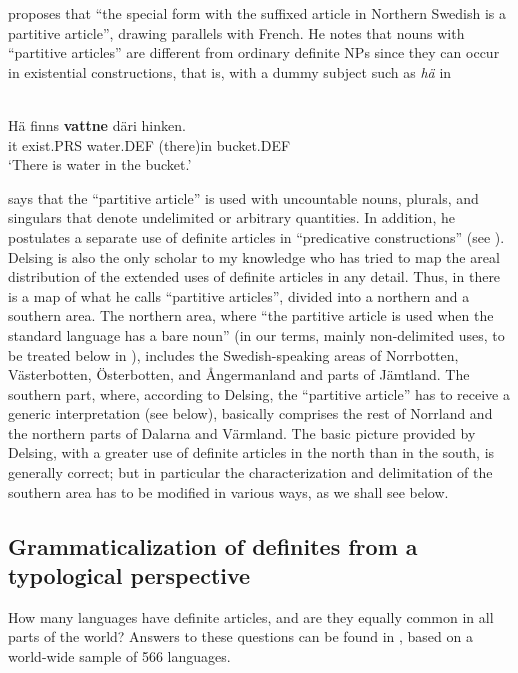 \citet[50]{Delsing1993} proposes that “the special form with the suffixed article in Northern Swedish is a partitive article”, drawing parallels with French. He notes that nouns with “partitive articles” are different from ordinary definite NPs since they can occur in existential constructions, that is, with a dummy subject such as \textit{hä} in 

\ea\label{}
\\
	\gll	Hä  finns  \textbf{vattne} däri  hinken.\\
			it  exist.PRS  water.DEF  (there)in  bucket.DEF\\
			
	\glt ‘There is water in the bucket.’
\z

\citet[15]{Delsing2003a} says that the “partitive article” is used with uncountable nouns, plurals, and singulars that denote undelimited or arbitrary quantities. In addition, he postulates a separate use of definite articles in “predicative constructions” (see ). Delsing is also the only scholar to my knowledge who has tried to map the areal distribution of the extended uses of definite articles in any detail. Thus, in \citet[18]{Delsing2003a} there is a map of what he calls “partitive articles”, divided into a northern and a southern area. The northern area, where “the partitive article is used when the standard language has a bare noun” (in our terms, mainly non-delimited uses, to be treated below in ), includes the Swedish-speaking areas of Norrbotten, Västerbotten, Österbotten, and Ångermanland and parts of Jämtland. The southern part, where, according to Delsing, the “partitive article” has to receive a generic interpretation (see  below), basically comprises the rest of Norrland and the northern parts of Dalarna and Värmland. The basic picture provided by Delsing, with a greater use of definite articles in the north than in the south, is generally correct; but in particular the characterization and delimitation of the southern area has to be modified in various ways, as we shall see below. 

\subsection{ Grammaticalization of definites from a typological perspective}
\label{bkm:Ref218335964}\label{bkm:Ref218335969}

How many languages have  definite articles, and are they equally common in all parts of the world? Answers to these questions can be found in \citet{Dryer2005}, based on a world-wide sample of 566 languages. 

